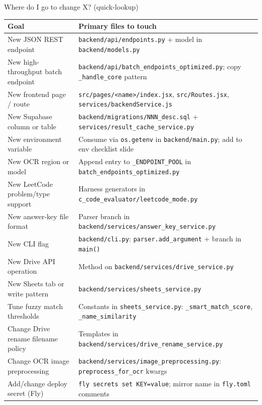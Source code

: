 \documentclass[aspectratio=169]{beamer}
\begin{document}
\begin{frame}{Where do I go to change X? (quick-lookup)}
  \tiny
  \begin{tabular}{@{}p{5.3cm}p{8.4cm}@{}}
    \toprule
    Goal & Primary files to touch \\
    \midrule
    New JSON REST endpoint & \texttt{backend/api/endpoints.py} + model in \texttt{backend/models.py} \\
    New high-throughput batch endpoint & \texttt{backend/api/batch\_endpoints\_optimized.py}; copy \texttt{\_handle\_core} pattern \\
    New frontend page / route & \texttt{src/pages/<name>/index.jsx}, \texttt{src/Routes.jsx}, \texttt{services/backendService.js} \\
    New Supabase column or table & \texttt{backend/migrations/NNN\_desc.sql} + \texttt{services/result\_cache\_service.py} \\
    New environment variable & Consume via \texttt{os.getenv} in \texttt{backend/main.py}; add to env checklist slide \\
    New OCR region or model & Append entry to \texttt{\_ENDPOINT\_POOL} in \texttt{batch\_endpoints\_optimized.py} \\
    New LeetCode problem/type support & Harness generators in \texttt{c\_code\_evaluator/leetcode\_mode.py} \\
    New answer-key file format & Parser branch in \texttt{backend/services/answer\_key\_service.py} \\
    New CLI flag & \texttt{backend/cli.py}: \texttt{parser.add\_argument} + branch in \texttt{main()} \\
    New Drive API operation & Method on \texttt{backend/services/drive\_service.py} \\
    New Sheets tab or write pattern & \texttt{backend/services/sheets\_service.py} \\
    Tune fuzzy match thresholds & Constants in \texttt{sheets\_service.py}: \texttt{\_smart\_match\_score}, \texttt{\_name\_similarity} \\
    Change Drive rename filename policy & Templates in \texttt{backend/services/drive\_rename\_service.py} \\
    Change OCR image preprocessing & \texttt{backend/services/image\_preprocessing.py}: \texttt{preprocess\_for\_ocr} kwargs \\
    Add/change deploy secret (Fly) & \texttt{fly secrets set KEY=value}; mirror name in \texttt{fly.toml} comments \\
    \bottomrule
  \end{tabular}
\end{frame}
\end{document}
